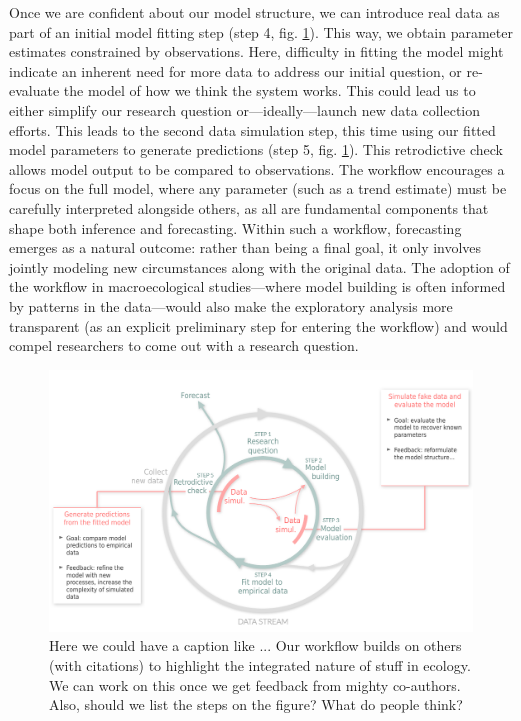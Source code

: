 \documentclass[11pt]{article}
\begin{document}
Once we are confident about our model structure, we can introduce real data as part of an initial model fitting step (step 4, fig. \ref{fig:workflow}). This way, we obtain parameter estimates constrained by observations. Here, difficulty in fitting the model might indicate an inherent need for more data to address our initial question, or re-evaluate the model of how we think the system works. This could lead us to either simplify our research question or---ideally---launch new data collection efforts. This leads to the second data simulation step, this time using our fitted model parameters to generate predictions (step 5, fig. \ref{fig:workflow}). This retrodictive check allows model output to be compared to observations. %
The workflow encourages a focus on the full model, where any parameter (such as a trend estimate) must be carefully interpreted alongside others, as all are fundamental components that shape both inference and forecasting. 
Within such a workflow, forecasting emerges as a natural outcome: rather than being a final goal, it only involves jointly modeling new circumstances along with the original data. The adoption of the workflow in macroecological studies---where model building is often informed by patterns in the data---would also make the exploratory analysis more transparent (as an explicit preliminary step for entering the workflow) and would compel researchers to come out with a research question. 

\begin{figure}[h]
	\centering
    \hspace*{-1.5cm}
	\includegraphics{figures/figure_worflow_wsteps}
	\caption{Here we could have a caption like ... Our workflow builds on others (with citations) to highlight the integrated nature of stuff in ecology. We can work on this once we get feedback from mighty co-authors. Also, should we list the steps on the figure? What do people think?} 
	\label{fig:workflow}
\end{figure}
\end{document}

